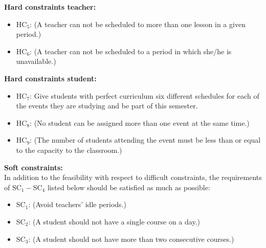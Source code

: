 \documentclass[centering]{report}
\newenvironment{slide}
    {\newpage
    \vspace*{\fill}
    }
    { 
     \vspace*{\fill}
    }
\begin{document}
\begin{slide}
\textbf{Hard constraints teacher:}\\

\begin{itemize}
\item $\mathrm{HC_{5}}$: {\color{gray}(A teacher can not be scheduled to more than one lesson in a given period.)}
\item $\mathrm{HC_{6}}$: {\color{gray}(A teacher can not be scheduled to a period in which she/he is unavailable.)}
\end{itemize}

\end{slide}

\begin{slide}
\textbf{Hard constraints student:}\\

\begin{itemize}
\item $\mathrm{HC_{7}}$: {Give students with perfect curriculum six different schedules for each of the events they are studying and be part of this semester.}
\item $\mathrm{HC_{8}}$: {\color{gray}(No student can be assigned more than one event at the same time.)}
\item $\mathrm{HC_{9}}$: {\color{gray}(The number of students attending the event must be less than or equal to the capacity to the classroom.)}
\end{itemize}
\end{slide}

\begin{slide}
\textbf{Soft constraints:}\\

In addition to the feasibility with respect to difficult constraints, the requirements of $ \mathrm {SC_{1}-SC_{4}} $ listed below should be satisfied as much as possible:

\begin{itemize}
\item $\mathrm{SC_{1}}$: {\color{gray}(Avoid teachers' idle periods.)}
\item $\mathrm{SC_{2}}$: {\color{gray}(A student should not have a single course on a day.)}
\item $\mathrm{SC_{3}}$: {\color{gray}(A student should not have more than two consecutive courses.)}
\end{itemize}

\end{slide}
\end{document}
